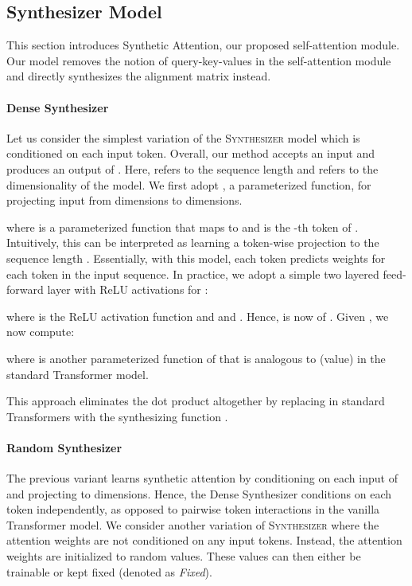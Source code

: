 \documentclass{article} \usepackage{iclr2021_conference,times}
\begin{document}
\subsection{Synthesizer Model}
This section introduces Synthetic Attention, our proposed self-attention module. Our model removes the notion of query-key-values in the self-attention module and directly synthesizes the alignment matrix instead. 

\paragraph{Dense Synthesizer} Let us consider the simplest variation of the \textsc{Synthesizer} model which is conditioned on each input token. Overall, our method accepts an input  and produces an output of . Here,  refers to the sequence length and  refers to the dimensionality of the model. We first adopt , a parameterized function, for projecting input  from  dimensions to  dimensions.

where  is a parameterized function that maps  to  and  is the -th token of . Intuitively, this can be interpreted as learning a token-wise projection to the sequence length . Essentially, with this model, each token predicts weights for each token in the input sequence. In practice, we adopt a simple two layered feed-forward layer with ReLU activations for :

where  is the ReLU activation function and  and . Hence,  is now of . Given , we now compute:

where  is another parameterized function of  that is analogous to  (value) in the standard Transformer model. 

This approach eliminates the dot product altogether by replacing   in standard Transformers with the synthesizing function . 

\paragraph{Random Synthesizer}
The previous variant learns synthetic attention by conditioning on each input of  and projecting to  dimensions. Hence, the Dense Synthesizer conditions on each token independently, as opposed to pairwise token interactions in the vanilla Transformer model. We consider another variation of \textsc{Synthesizer} where the attention weights are not conditioned on any input tokens. Instead, the attention weights are initialized to random values. These values can then either be trainable or kept fixed (denoted as \textit{Fixed}).
\end{document}

